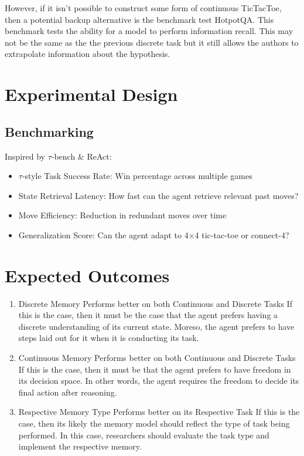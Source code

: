 \documentclass[11pt]{article}
\begin{document}
However, if it isn't possible to construct some form of continuous TicTacToe, then a potential backup alternative is the benchmark test HotpotQA. This benchmark tests the ability for a model to perform information recall. This may not be the same as the the previous discrete task but it still allows the authors to extrapolate information about the hypothesis.

\section{Experimental Design}
\subsection{Benchmarking}
Inspired by $\tau$-bench \& ReAct:
\begin{itemize}
    \item $\tau$-style Task Success Rate: Win percentage across multiple games
    \item State Retrieval Latency: How fast can the agent retrieve relevant past moves?
    \item Move Efficiency: Reduction in redundant moves over time
    \item Generalization Score: Can the agent adapt to 4×4 tic-tac-toe or connect-4?
\end{itemize}

\section{Expected Outcomes}
\begin{enumerate}
    \item Discrete Memory Performs better on both Continuous and Discrete Tasks
    \subitem If this is the case, then it must be the case that the agent prefers having a discrete understanding of its current state. Moreso, the agent prefers to have steps laid out for it when it is conducting its task.
    \item Continuous Memory Performs better on both Continuous and Discrete Tasks
    \subitem If this is the case, then it must be that the agent prefers to have freedom in its decision space. In other words, the agent requires the freedom to decide its final action after reasoning.
    \item Respective Memory Type Performs better on its Respective Task
    \subitem If this is the case, then its likely the memory model should reflect the type of task being performed. In this case, researchers should evaluate the task type and implement the respective memory.
\end{enumerate}
\end{document}
